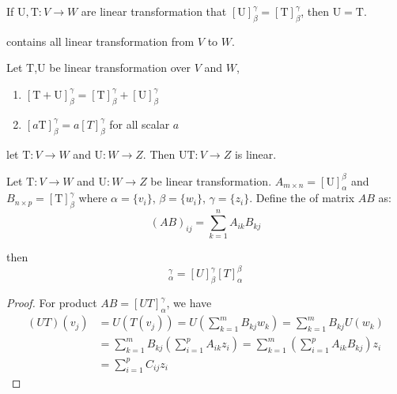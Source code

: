 \begin{theorem}
	If $\mathrm{U},\mathrm{T}:V \rightarrow W$ are linear transformation that $[\mathrm{U}]_\beta^\gamma = [\mathrm{T}]_\beta^\gamma$, then $\mathrm{U} = \mathrm{T}$.
\end{theorem}

\begin{definition}
	 contains all linear transformation from $V$ to $W$.
\end{definition}

\begin{theorem}
	Let $\mathrm{T}$,$\mathrm{U}$ be linear transformation over $V$ and $W$, 
	\begin{enumerate}
		\item $[\mathrm{T} + \mathrm{U}]_\beta^\gamma = [\mathrm{T}]_\beta^\gamma  + [\mathrm{U}]_\beta^\gamma $
		\item $[a \mathrm{T} ]_\beta^\gamma = a[T]_\beta^\gamma $ for all scalar $a$
	\end{enumerate}
\end{theorem}

\begin{theorem}
	let $\mathrm{T}:V\rightarrow W$ and $\mathrm{U}:W\rightarrow Z$. Then $\mathrm{UT}: V \rightarrow Z$ is linear.
\end{theorem}

\begin{definition}
	Let $\mathrm{T}:V\rightarrow W$ and $\mathrm{U}:W\rightarrow Z$ be linear transformation. $A_{m \times n}=[\mathrm{U}]_\alpha^\beta$ and $B_{n \times p}=[\mathrm{T}]_\beta^\gamma$ where $\alpha=\{v_i\}$, $\beta=\{w_i\}$, $\gamma=\{z_i\}$. Define the  of matrix $AB$ as:
	\begin{equation}
		(AB)_{ij} = \sum_{k=1}^n A_{ik} B_{kj}
	\end{equation}
	
	then 
	\begin{equation}
	    [UT]_\alpha^\gamma = [U]_\beta^\gamma [T]_\alpha^\beta
	\end{equation}
\end{definition}

\begin{proof}
	For product $AB=[UT]_\alpha^\gamma$, we have 
	\begin{equation}
		\begin{aligned}
			(UT)(v_j) &= U(T(v_j)) = U \left( \sum_{k=1}^m B_{kj} w_k \right) = \sum_{k=1}^m B_{kj} U(w_k) \\
			&= \sum_{k=1}^m B_{kj} \left( \sum_{i=1}^p A_{ik} z_i \right) = \sum_{k=1}^m  \left( \sum_{i=1}^p A_{ik} B_{kj} \right)  z_i \\
			&= \sum_{i=1}^p C_{ij} z_i
		\end{aligned}
	\end{equation}
\end{proof}


